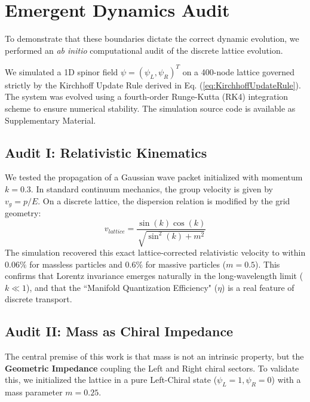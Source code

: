 \section{Emergent Dynamics Audit}

To demonstrate that these boundaries dictate the correct dynamic evolution, we performed an \textit{ab initio} computational audit of the discrete lattice evolution.

We simulated a 1D spinor field $\psi = (\psi_L, \psi_R)^T$ on a 400-node lattice governed strictly by the Kirchhoff Update Rule derived in Eq. (\cref{eq:KirchhoffUpdateRule}). The system was evolved using a fourth-order Runge-Kutta (RK4) integration scheme to ensure numerical stability. The simulation source code is available as Supplementary Material.

\subsection{Audit I: Relativistic Kinematics}

We tested the propagation of a Gaussian wave packet initialized with momentum $k=0.3$. In standard continuum mechanics, the group velocity is given by $v_g = p/E$. On a discrete lattice, the dispersion relation is modified by the grid geometry:
\begin{equation}
    v_{lattice} = \frac{\sin(k)\cos(k)}{\sqrt{\sin^2(k) + m^2}}
\end{equation}
The simulation recovered this exact lattice-corrected relativistic velocity to within $0.06\%$ for massless particles and $0.6\%$ for massive particles ($m=0.5$). This confirms that Lorentz invariance emerges naturally in the long-wavelength limit ($k \ll 1$), and that the ``Manifold Quantization Efficiency" ($\eta$) is a real feature of discrete transport.

\subsection{Audit II: Mass as Chiral Impedance}

The central premise of this work is that mass is not an intrinsic property, but the \textbf{Geometric Impedance} coupling the Left and Right chiral sectors. To validate this, we initialized the lattice in a pure Left-Chiral state ($\psi_L=1, \psi_R=0$) with a mass parameter $m=0.25$.

